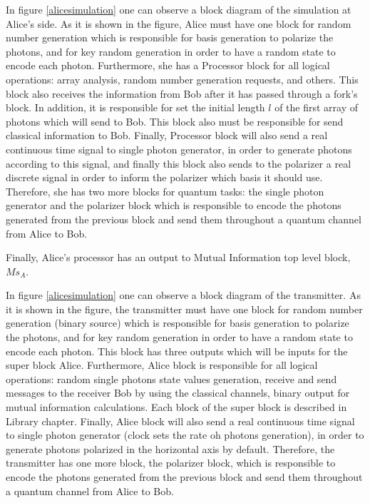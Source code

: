     In figure \ref{alicesimulation} one can observe a block diagram of the simulation at Alice's side. As it is shown in the figure, Alice must have one block for random number generation which is responsible for basis generation to polarize the photons, and for key random generation in order to have a random state to encode each photon. Furthermore, she has a Processor block for all logical operations: array analysis, random number generation requests, and others. This block also receives the information from Bob after it has passed through a fork's block. In addition, it is responsible for set the initial length $l$ of the first array of photons which will send to Bob. This block also must be responsible for send classical information to Bob. Finally, Processor block will also send a real continuous time signal to single photon generator, in order to generate photons according to this signal, and finally this block also sends to the polarizer a real discrete signal in order to inform the polarizer which basis it should use. Therefore, she has two more blocks for quantum tasks: the single photon generator and the polarizer block which is responsible to encode the photons generated from the previous block and send them throughout a quantum channel from Alice to Bob.

    Finally, Alice's processor has an output to Mutual Information top level block, $Ms_{A}$.

    In figure \ref{alicesimulation} one can observe a block diagram of the transmitter. As it is shown in the figure, the transmitter must have one block for random number generation (binary source) which is responsible for basis generation to polarize the photons, and for key random generation in order to have a random state to encode each photon. This block has three outputs which will be inputs for the super block Alice. Furthermore, Alice block is responsible for all logical operations: random single photons state values generation, receive and send messages to the receiver Bob by using the classical channels, binary output for mutual information calculations. Each block of the super block is described in Library chapter. Finally, Alice block will also send a real continuous time signal to single photon generator (clock sets the rate oh photons generation), in order to generate photons polarized in the horizontal axis by default. Therefore, the transmitter has one more block, the polarizer block, which is responsible to encode the photons generated from the previous block and send them throughout a quantum channel from Alice to Bob.

